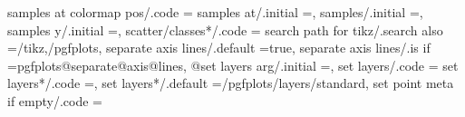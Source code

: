 {{{{{{{{{{{{{{{{{{{{{{{{{{{{{{{{{{{{{{{{{{{samples at colormap pos/.code                                      ={%
samples at/.initial                                                =,%
samples/.initial                                                   =,%
samples y/.initial                                                 =,%
scatter/classes*/.code                                             ={%
search path for tikz/.search also                                  ={/tikz,/pgfplots},                                                                                                                 
separate axis lines/.default                                       =true,                                                                                                                              
separate axis lines/.is if                                         =pgfplots@separate@axis@lines,                                                                                                      
@set layers arg/.initial                                           =,                                                                                                                                  
set layers/.code                                                   ={%
set layers*/.code                                                  =,                                                                                                      
set layers*/.default                                               ={/pgfplots/layers/standard},                                                                                                       
set point meta if empty/.code                                      ={%
}}}}}}}}}}}}}}}}}}}}}}}}}}}}}}}}}}}}}}}}}}}}}}}
